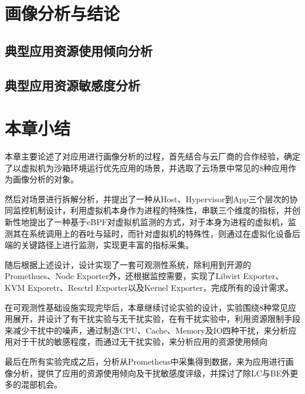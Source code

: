 \section{画像分析与结论}

\subsection{典型应用资源使用倾向分析}

\subsection{典型应用资源敏感度分析}

\section{本章小结}

本章主要论述了对应用进行画像分析的过程，首先结合与云厂商的合作经验，确定了以虚拟机为沙箱环境运行优先应用的场景，并选取了云场景中常见的8种应用作为画像分析的对象。

然后对场景进行拆解分析，并提出了一种从Host、Hypervisor到App三个层次的协同监控机制设计，利用虚拟机本身作为进程的特殊性，串联三个维度的指标，并创新性地提出了一种基于eBPF对虚拟机监测的方式，对于本身为进程的虚拟机，监测其在系统调用上的吞吐与延时，而针对虚拟机的特殊性，则通过在虚拟化设备后端的关键路径上进行监测，实现更丰富的指标采集。

随后根据上述设计，设计实现了一套可观测性系统，除利用到开源的Promethues、Node Exporter外，还根据监控需要，实现了Libvirt Exporter、KVM Exporetr、Resctrl Exporter以及Kernel Exporter，完成所有的设计需求。

在可观测性基础设施实现完毕后，本章继续讨论实验的设计，实验围绕8种常见应用展开，并设计了有干扰实验与无干扰实验，在有干扰实验中，利用资源限制手段来减少干扰中的噪声，通过制造CPU、Cache、Memory及IO四种干扰，来分析应用对于干扰的敏感程度，而通过无干扰实验，来分析应用的资源使用倾向

最后在所有实验完成之后，分析从Prometheus中采集得到数据，来为应用进行画像分析，提供了应用的资源使用倾向及干扰敏感度评级，并探讨了除LC与BE外更多的混部机会。